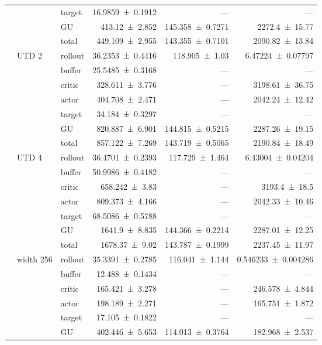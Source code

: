 {\begin{longtable}{@{}lllrrr@{}}
     &  & target & \num{16.9859+-0.1912} & --- & --- \\
     &  & GU & \num{413.12+-2.852} & \num{145.358+-0.7271} & \num{2272.4+-15.77} \\
     &  & total & \num{449.109+-2.955} & \num{143.355+-0.7101} & \num{2090.82+-13.84} \\
    \addlinespace[2pt]
     & UTD 2 & rollout & \num{36.2353+-0.4416} & \num{118.905+-1.03} & \num{6.47224+-0.07797} \\
     &  & buffer & \num{25.5485+-0.3168} & --- & --- \\
     &  & critic & \num{328.611+-3.776} & --- & \num{3198.61+-36.75} \\
     &  & actor & \num{404.708+-2.471} & --- & \num{2042.24+-12.42} \\
     &  & target & \num{34.184+-0.3297} & --- & --- \\
     &  & GU & \num{820.887+-6.901} & \num{144.815+-0.5215} & \num{2287.26+-19.15} \\
     &  & total & \num{857.122+-7.269} & \num{143.719+-0.5065} & \num{2190.84+-18.49} \\
    \addlinespace[2pt]
     & UTD 4 & rollout & \num{36.4701+-0.2393} & \num{117.729+-1.464} & \num{6.43004+-0.04204} \\
     &  & buffer & \num{50.9986+-0.4182} & --- & --- \\
     &  & critic & \num{658.242+-3.83} & --- & \num{3193.4+-18.5} \\
     &  & actor & \num{809.373+-4.166} & --- & \num{2042.33+-10.46} \\
     &  & target & \num{68.5086+-0.5788} & --- & --- \\
     &  & GU & \num{1641.9+-8.835} & \num{144.366+-0.2214} & \num{2287.01+-12.25} \\
     &  & total & \num{1678.37+-9.02} & \num{143.787+-0.1999} & \num{2237.45+-11.97} \\
    \addlinespace[2pt]
     & width 256 & rollout & \num{35.3391+-0.2785} & \num{116.041+-1.144} & \num{0.546233+-0.004286} \\
     &  & buffer & \num{12.488+-0.1434} & --- & --- \\
     &  & critic & \num{165.421+-3.278} & --- & \num{246.578+-4.844} \\
     &  & actor & \num{198.189+-2.271} & --- & \num{165.751+-1.872} \\
     &  & target & \num{17.105+-0.1822} & --- & --- \\
     &  & GU & \num{402.446+-5.653} & \num{114.013+-0.3764} & \num{182.968+-2.537} \\

\end{longtable}}

